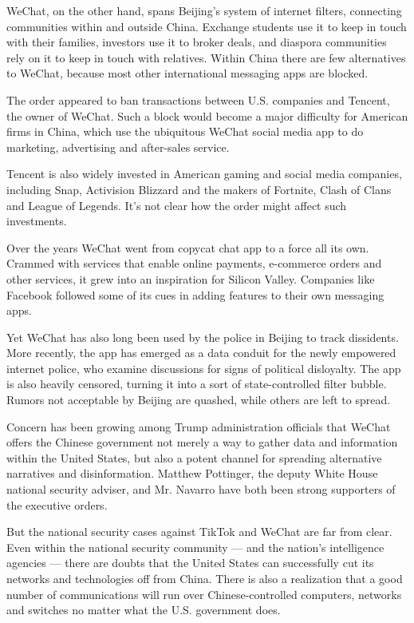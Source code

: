 WeChat, on the other hand, spans Beijing's system of internet filters,
connecting communities within and outside China. Exchange students use
it to keep in touch with their families, investors use it to broker
deals, and diaspora communities rely on it to keep in touch with
relatives. Within China there are few alternatives to WeChat, because
most other international messaging apps are blocked.

The order appeared to ban transactions between U.S. companies and
Tencent, the owner of WeChat. Such a block would become a major
difficulty for American firms in China, which use the ubiquitous WeChat
social media app to do marketing, advertising and after-sales service.

Tencent is also widely invested in American gaming and social media
companies, including Snap, Activision Blizzard and the makers of
Fortnite, Clash of Clans and League of Legends. It's not clear how the
order might affect such investments.

Over the years WeChat went from copycat chat app to a force all its own.
Crammed with services that enable online payments, e-commerce orders and
other services, it grew into an inspiration for Silicon Valley.
Companies like Facebook followed some of its cues in adding features to
their own messaging apps.

Yet WeChat has also long been used by the police in Beijing to track
dissidents. More recently, the app has emerged as a data conduit for the
newly empowered internet police, who examine discussions for signs of
political disloyalty. The app is also heavily censored, turning it into
a sort of state-controlled filter bubble. Rumors not acceptable by
Beijing are quashed, while others are left to spread.

Concern has been growing among Trump administration officials that
WeChat offers the Chinese government not merely a way to gather data and
information within the United States, but also a potent channel for
spreading alternative narratives and disinformation. Matthew Pottinger,
the deputy White House national security adviser, and Mr. Navarro have
both been strong supporters of the executive orders.

But the national security cases against TikTok and WeChat are far from
clear. Even within the national security community --- and the nation's
intelligence agencies --- there are doubts that the United States can
successfully cut its networks and technologies off from China. There is
also a realization that a good number of communications will run over
Chinese-controlled computers, networks and switches no matter what the
U.S. government does.

